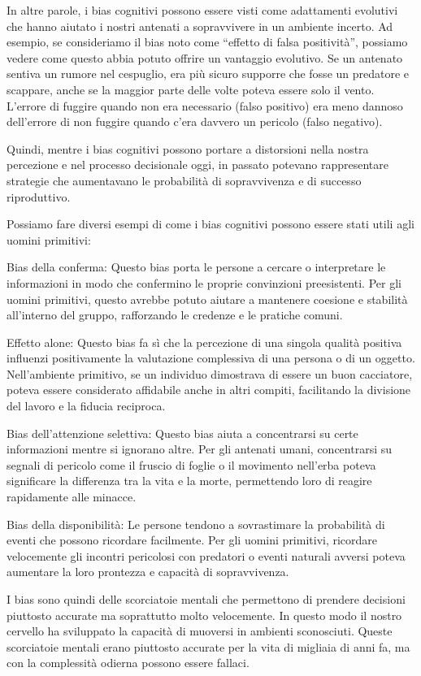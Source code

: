 \documentclass[12pt]{book} %
\begin{document}
In altre parole, i bias cognitivi possono essere visti come adattamenti evolutivi che hanno aiutato i nostri antenati a
sopravvivere in un ambiente incerto. Ad esempio, se consideriamo il bias noto come “effetto di falsa positività”,
possiamo vedere come questo abbia potuto offrire un vantaggio evolutivo. Se un antenato sentiva un rumore nel
cespuglio, era più sicuro supporre che fosse un predatore e scappare, anche se la maggior parte delle volte poteva
essere solo il vento. L'errore di fuggire quando non era necessario (falso positivo) era meno
dannoso dell'errore di non fuggire quando c'era davvero un pericolo (falso
negativo).

Quindi, mentre i bias cognitivi possono portare a distorsioni nella nostra percezione e nel processo decisionale oggi,
in passato potevano rappresentare strategie che aumentavano le probabilità di sopravvivenza e di successo riproduttivo.


Possiamo fare diversi esempi di come i bias cognitivi possono essere stati utili agli uomini primitivi:

Bias della conferma: Questo bias porta le persone a cercare o interpretare le informazioni in modo che confermino le
proprie convinzioni preesistenti. Per gli uomini primitivi, questo avrebbe potuto aiutare a mantenere coesione e
stabilità all'interno del gruppo, rafforzando le credenze e le pratiche comuni.

Effetto alone: Questo bias fa sì che la percezione di una singola qualità positiva influenzi positivamente la
valutazione complessiva di una persona o di un oggetto. Nell'ambiente primitivo, se un individuo
dimostrava di essere un buon cacciatore, poteva essere considerato affidabile anche in altri compiti, facilitando la
divisione del lavoro e la fiducia reciproca.

Bias dell'attenzione selettiva: Questo bias aiuta a concentrarsi su certe informazioni mentre si
ignorano altre. Per gli antenati umani, concentrarsi su segnali di pericolo come il fruscio di foglie o il movimento
nell'erba poteva significare la differenza tra la vita e la morte, permettendo loro di reagire
rapidamente alle minacce.

Bias della disponibilità: Le persone tendono a sovrastimare la probabilità di eventi che possono ricordare facilmente.
Per gli uomini primitivi, ricordare velocemente gli incontri pericolosi con predatori o eventi naturali avversi poteva
aumentare la loro prontezza e capacità di sopravvivenza.

I bias sono quindi delle scorciatoie mentali che permettono di prendere decisioni piuttosto accurate ma soprattutto
molto velocemente. In questo modo il nostro cervello ha sviluppato la capacità di muoversi in ambienti sconosciuti.
Queste scorciatoie mentali erano piuttosto accurate per la vita di migliaia di anni fa, ma con la complessità odierna
possono essere fallaci.
\end{document}
